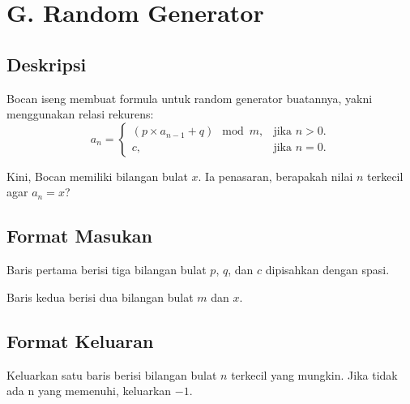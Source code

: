 \documentclass{article}
\begin{document}
\section*{\hfil G. Random Generator\hfil}


\subsection*{Deskripsi}

\par\noindent Bocan iseng membuat formula untuk random generator buatannya, yakni menggunakan relasi rekurens:
\begin{equation*}
  a_n=\begin{cases}
    (p \times a_{n-1} + q) \mod m, & \text{jika $n>0$}.\\
    c, & \text{jika $n=0$}.
  \end{cases}
\end{equation*}


\par\noindent Kini, Bocan memiliki bilangan bulat $x$. Ia penasaran, berapakah nilai $n$ terkecil agar $a_n = x$?

\subsection*{Format Masukan}

\par\noindent Baris pertama berisi tiga bilangan bulat $p$, $q$, dan $c$ dipisahkan dengan spasi.
\par\noindent Baris kedua berisi dua bilangan bulat $m$ dan $x$.

\subsection*{Format Keluaran}

\par\noindent Keluarkan satu baris berisi bilangan bulat $n$ terkecil yang mungkin. Jika tidak ada n yang memenuhi, keluarkan $-1$.
\end{document}
